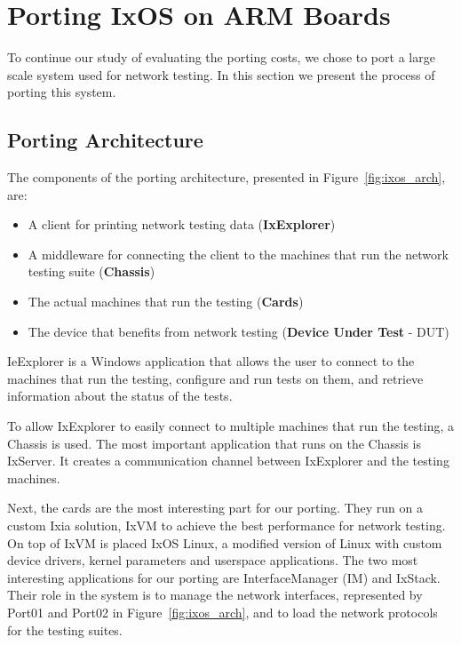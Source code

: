 \chapter{Porting IxOS on ARM Boards} \label{sec:portingIxos}

To continue our study of evaluating the porting costs, we chose to port a large
scale system used for network testing. In this section we present the
process of porting this system. 

\section{Porting Architecture}

The components of the porting architecture, presented in
Figure~\ref{fig:ixos_arch}, are:
\begin{itemize}
    \item A client for printing network testing data (\textbf{IxExplorer})
    \item A middleware for connecting the client to the machines that run the
    network testing suite (\textbf{Chassis})
    \item The actual machines that run the testing (\textbf{Cards})
    \item The device that benefits from network testing (\textbf{Device Under Test} - DUT)
\end{itemize}

IeExplorer is a Windows application that allows the user to connect to the
machines that run the testing, configure and run tests on them, and retrieve
information about the status of the tests.

To allow IxExplorer to easily connect to multiple machines that run the testing,
a Chassis is used. The most important application that runs on the Chassis is
IxServer. It creates a communication channel between IxExplorer and the testing
machines. 

Next, the cards are the most interesting part for our porting. They run on a
custom Ixia solution, IxVM to achieve the best performance for network testing. On top
of IxVM is placed IxOS Linux, a modified version of Linux with custom
device drivers, kernel parameters and userspace applications. The two most
interesting applications for our porting are InterfaceManager (IM) and IxStack.
Their role in the system is to manage the network interfaces, represented by
Port01 and Port02 in Figure~\ref{fig:ixos_arch}, and to load the network
protocols for the testing suites.


